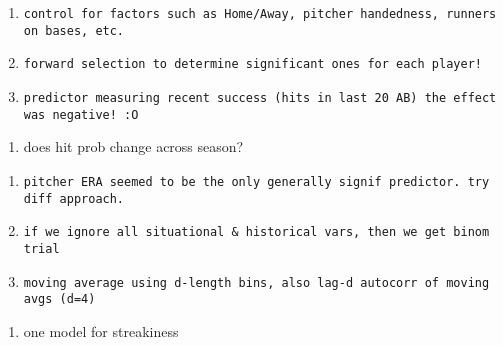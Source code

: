 \documentclass[12pt,twoside]{dukestatscithesis}
\providecommand{\tightlist}{%
  \setlength{\itemsep}{0pt}\setlength{\parskip}{0pt}}
\theoremstyle{definition}
\theoremstyle{definition}
\theoremstyle{definition}
\theoremstyle{remark}
\begin{document}
\begin{enumerate}
\def\labelenumi{\arabic{enumi}.}
\item
\begin{verbatim}
control for factors such as Home/Away, pitcher handedness, runners on bases, etc.
\end{verbatim}
\item
\begin{verbatim}
forward selection to determine significant ones for each player!
\end{verbatim}
\item
\begin{verbatim}
predictor measuring recent success (hits in last 20 AB) the effect was negative! :O
\end{verbatim}
\end{enumerate}
\begin{enumerate}
\def\labelenumi{\Alph{enumi}.}
\setcounter{enumi}{2}
\tightlist
\item
  does hit prob change across season?
\end{enumerate}
\begin{enumerate}
\def\labelenumi{\arabic{enumi}.}
\item
\begin{verbatim}
pitcher ERA seemed to be the only generally signif predictor. try diff approach.
\end{verbatim}
\item
\begin{verbatim}
if we ignore all situational & historical vars, then we get binom trial
\end{verbatim}
\item
\begin{verbatim}
moving average using d-length bins, also lag-d autocorr of moving avgs (d=4)
\end{verbatim}
\end{enumerate}
\begin{enumerate}
\def\labelenumi{\Alph{enumi}.}
\setcounter{enumi}{3}
\tightlist
\item
  one model for streakiness
\end{enumerate}
\end{document}
